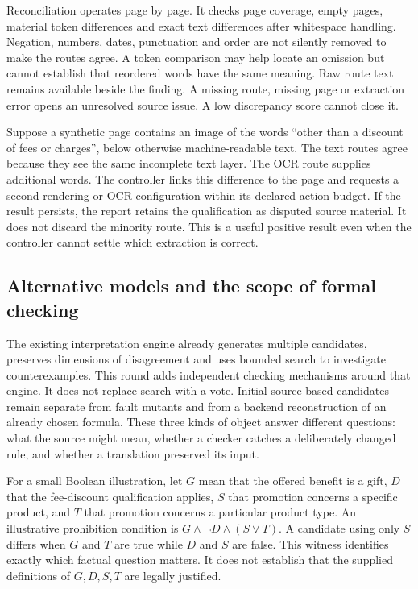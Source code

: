 Reconciliation operates page by page. It checks page coverage, empty pages,
material token differences and exact text differences after whitespace handling.
Negation, numbers, dates, punctuation and order are not silently removed to make
the routes agree. A token comparison may help locate an omission but cannot
establish that reordered words have the same meaning. Raw route text remains
available beside the finding. A missing route, missing page or extraction error
opens an unresolved source issue. A low discrepancy score cannot close it.

Suppose a synthetic page contains an image of the words ``other than a discount
of fees or charges'', below otherwise machine-readable text. The text routes
agree because they see the same incomplete text layer. The OCR route supplies
additional words. The controller links this difference to the page and requests
a second rendering or OCR configuration within its declared action budget. If
the result persists, the report retains the qualification as disputed source
material. It does not discard the minority route. This is a useful positive
result even when the controller cannot settle which extraction is correct.

\subsection{Alternative models and the scope of formal checking}

The existing interpretation engine already generates multiple candidates,
preserves dimensions of disagreement and uses bounded search to investigate
counterexamples. This round adds independent checking mechanisms around that
engine. It does not replace search with a vote. Initial source-based candidates
remain separate from fault mutants and from a backend reconstruction of an
already chosen formula. These three kinds of object answer different questions:
what the source might mean, whether a checker catches a deliberately changed
rule, and whether a translation preserved its input.

For a small Boolean illustration, let $G$ mean that the offered benefit is a
gift, $D$ that the fee-discount qualification applies, $S$ that promotion concerns
a specific product, and $T$ that promotion concerns a particular product type.
An illustrative prohibition condition is $G\land\neg D\land(S\lor T)$. A
candidate using only $S$ differs when $G$ and $T$ are true while $D$ and $S$ are
false. This witness identifies exactly which factual question matters. It does
not establish that the supplied definitions of $G,D,S,T$ are legally justified.

